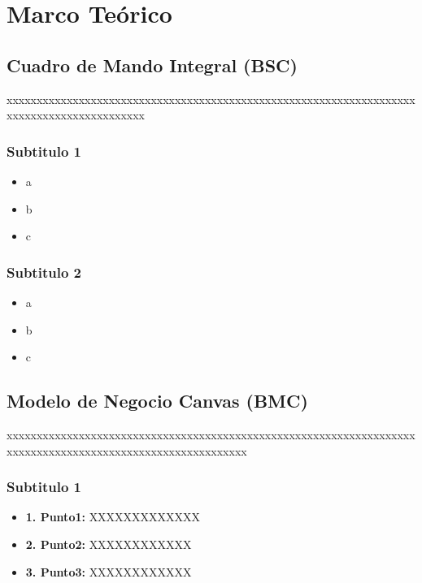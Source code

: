 \documentclass[preprint,12pt]{elsarticle}
\begin{document}
\section{Marco Teórico}

	\subsection{\textbf{Cuadro de Mando Integral (BSC)}}
	
xxxxxxxxxxxxxxxxxxxxxxxxxxxxxxxxxxxxxxxxxxxxxxxxxxxxxxxxxxxxxxxxxxxxxxxxxxxxxxxxxxxxxxxxxxx\cite{referenciarobles1}

\subsubsection{\textbf{Subtitulo 1}}

	\begin{itemize}
	\item a
	\item b
	\item c
	\end{itemize}



\subsubsection{\textbf{Subtitulo 2}}

	\begin{itemize}
	\item a
	\item b
	\item c
	\end{itemize}


	\subsection{\textbf{Modelo de Negocio Canvas (BMC) }}
	
xxxxxxxxxxxxxxxxxxxxxxxxxxxxxxxxxxxxxxxxxxxxxxxxxxxxxxxxxxxxxxxxxxxxxxxxxxxxxxxxxxxxxxxxxxxxxxxxxxxxxxxxxxxx

	\subsubsection{\textbf{Subtitulo 1}}
	\begin{itemize}
	\item{\textbf{1. Punto1: }}XXXXXXXXXXXXX
	\item {\textbf{2. Punto2: }}XXXXXXXXXXXX
	\item {\textbf{3. Punto3: }}XXXXXXXXXXXX
	\end{itemize}
\end{document}
